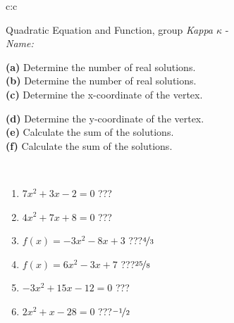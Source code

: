 \documentclass[10pt]{report}
\begin{document}
\begin{tabular}{c:c}
\begin{minipage}[c][104.5mm][t]{0.5\linewidth}
\begin{center}
\vspace{7mm}
{\huge {\LARGE Quadratic Equation and Function}, group \textit{Kappa $\kappa$} -}\\[5mm]
\textit{Name:}\phantom{xxxxxxxxxxxxxxxxxxxxxxxxxxxxxxxxxxxxxxxxxxxxxxxxxxxxxxxxxxxxxxxxx}\\[5mm]
\begin{minipage}{0.95\linewidth}
\begin{center}
{\small \begin{minipage}{0.5\textwidth}
\textbf{(a)} Determine the number of real solutions. \\[1mm]
\textbf{(b)} Determine the number of real solutions. \\[1mm]
\textbf{(c)} Determine the x-coordinate of the vertex.
\end{minipage} \begin{minipage}{0.49\textwidth}
\textbf{(d)} Determine the y-coordinate of the vertex. \\[1mm]
\textbf{(e)} Calculate the sum of the solutions. \\[1mm]
\textbf{(f)} Calculate the sum of the solutions.
\end{minipage}
}
\end{center}
\end{minipage}
\\[4mm]
\begin{minipage}{0.79\linewidth}
\begin{center}
\begin{varwidth}{\linewidth}
\begin{enumerate}
\Large
\item $7x^2+3x-2=0$\quad \dotfill\; ???\;\dotfill {}
\item $4x^2+7x+8=0$\quad \dotfill\; ???\;\dotfill {}
\item $f(x)=-3x^2-8x+3$\quad \dotfill\; ???\;\dotfill \quad $\nicefrac{4}{3}$
\item $f(x)=6x^2-3x+7$\quad \dotfill\; ???\;\dotfill \quad $\nicefrac{25}{8}$
\item $-3x^2+15x-12=0$\quad \dotfill\; ???\;\dotfill {}
\item $2x^2+x-28=0$\quad \dotfill\; ???\;\dotfill \quad $\nicefrac{-1}{2}$
\end{enumerate}
\end{varwidth}

\end{center}
\end{minipage}
\end{center}
\end{minipage}
\end{tabular}
\end{document}
